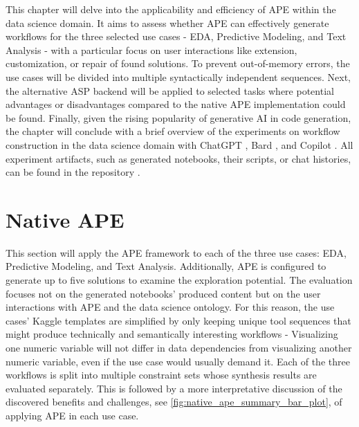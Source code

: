 This chapter will delve into the applicability and efficiency of APE within the data science domain. It aims to assess whether APE can effectively generate workflows for the three selected use cases - EDA, Predictive Modeling, and Text Analysis - with a particular focus on user interactions like extension, customization, or repair of found solutions. To prevent out-of-memory errors, the use cases will be divided into multiple syntactically independent sequences. Next, the alternative ASP backend will be applied to selected tasks where potential advantages or disadvantages compared to the native APE implementation could be found. Finally, given the rising popularity of generative AI in code generation, the chapter will conclude with a brief overview of the experiments on workflow construction in the data science domain with ChatGPT \cite{ChatGPT}, Bard \cite{Bard}, and Copilot \cite{openAI2021codex}. All experiment artifacts, such as generated notebooks, their scripts, or chat histories, can be found in the repository \cite{PanRepo}.

\section{Native APE}

This section will apply the APE framework to each of the three use cases: EDA, Predictive Modeling, and Text Analysis. Additionally, APE is configured to generate up to five solutions to examine the exploration potential. The evaluation focuses not on the generated notebooks' produced content but on the user interactions with APE and the data science ontology. For this reason, the use cases' Kaggle templates are simplified by only keeping unique tool sequences that might produce technically and semantically interesting workflows - Visualizing one numeric variable will not differ in data dependencies from visualizing another numeric variable, even if the use case would usually demand it. Each of the three workflows is split into multiple constraint sets whose synthesis results are evaluated separately. This is followed by a more interpretative discussion of the discovered benefits and challenges, see \autoref{fig:native_ape_summary_bar_plot}, of applying APE in each use case.

